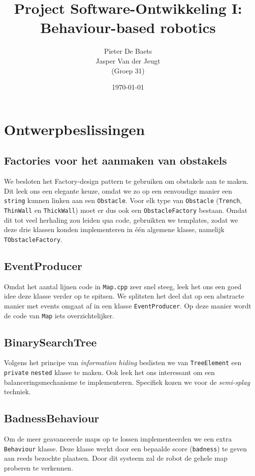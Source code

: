 \documentclass[a4paper]{article}
\title{Project Software-Ontwikkeling I: \\
       Behaviour-based robotics}
\author{Pieter De Baets \\
        Jasper Van der Jeugt \\
        (Groep 31)}
\date{\today}
\begin{document}
\maketitle

\section*{Ontwerpbeslissingen}
\subsection*{Factories voor het aanmaken van obstakels}
We besloten het Factory-design pattern te gebruiken om obstakels aan te maken.
Dit leek ons een elegante keuze, omdat we zo op een eenvoudige manier een
\verb#string# kunnen linken aan een \verb#Obstacle#. Voor elk type van
\verb#Obstacle# (\verb#Trench#, \verb#ThinWall# en \verb#ThickWall#) moet er
dus ook een \verb#ObstacleFactory# bestaan. Omdat dit tot veel herhaling zou
leiden qua code, gebruikten we templates, zodat we deze drie klassen konden
implementeren in \'e\'en algemene klasse, namelijk \verb#TObstacleFactory#.

\subsection*{EventProducer}
Omdat het aantal lijnen code in \verb#Map.cpp# zeer snel steeg, leek het ons een
goed idee deze klasse verder op te spitsen. We splitsten het deel dat op een
abstracte manier met events omgaat af in een klasse \verb#EventProducer#. Op
deze manier wordt de code van \verb#Map# iets overzichtelijker.

\subsection*{BinarySearchTree}
Volgens het principe van \emph{information hiding} beslisten we van
\verb#TreeElement# een \verb#private# \verb#nested# klasse te maken. Ook leek
het ons interessant om een balanceringsmechanisme te implementeren. Specifiek
kozen we voor de \emph{semi-splay} techniek.

\subsection*{BadnessBehaviour}
Om de meer geavanceerde maps op te lossen implementeerden we een extra
\verb#Behaviour# klasse. Deze klasse werkt door een bepaalde score
(\verb#badness#) te geven aan reeds bezochte plaatsen. Door dit systeem zal
de robot de gehele map proberen te verkennen.
\end{document}
